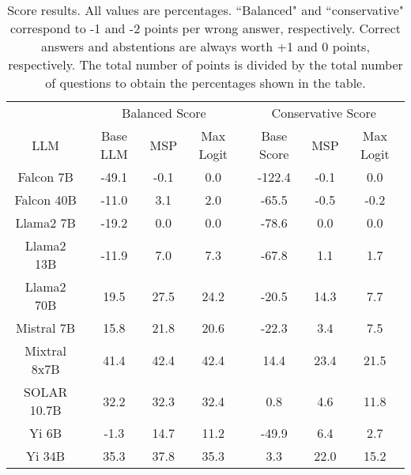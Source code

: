 \renewcommand\arraystretch{1.2}
\begin{table*}
\centering
\begin{tabular}{c|c|c|c|c|c|c}
& \multicolumn{3}{c|}{Balanced Score} & \multicolumn{3}{c}{Conservative Score} \\ 
LLM & Base LLM & MSP & Max Logit & Base Score & MSP & Max Logit\\ \hline
Falcon 7B & -49.1 & -0.1 & 0.0 & -122.4 & -0.1 & 0.0\\
Falcon 40B & -11.0 & 3.1 & 2.0 & -65.5 & -0.5 & -0.2\\
Llama2 7B & -19.2 & 0.0 & 0.0 & -78.6 & 0.0 & 0.0\\
Llama2 13B & -11.9 & 7.0 & 7.3 & -67.8 & 1.1 & 1.7\\
Llama2 70B & 19.5 & 27.5 & 24.2 & -20.5 & 14.3 & 7.7\\
Mistral 7B & 15.8 & 21.8 & 20.6 & -22.3 & 3.4 & 7.5\\
Mixtral 8x7B & 41.4 & 42.4 & 42.4 & 14.4 & 23.4 & 21.5\\
SOLAR 10.7B & 32.2 & 32.3 & 32.4 & 0.8 & 4.6 & 11.8\\
Yi 6B & -1.3 & 14.7 & 11.2 & -49.9 & 6.4 & 2.7\\
Yi 34B & 35.3 & 37.8 & 35.3 & 3.3 & 22.0 & 15.2\\
\hline
\end{tabular}
\caption{Score results. All values are percentages. ``Balanced" and ``conservative" correspond to -1 and -2 points per wrong answer, respectively. Correct answers and abstentions are always worth +1 and 0 points, respectively. The total number of points is divided by the total number of questions to obtain the percentages shown in the table.}
\label{tab:score}
\end{table*}

